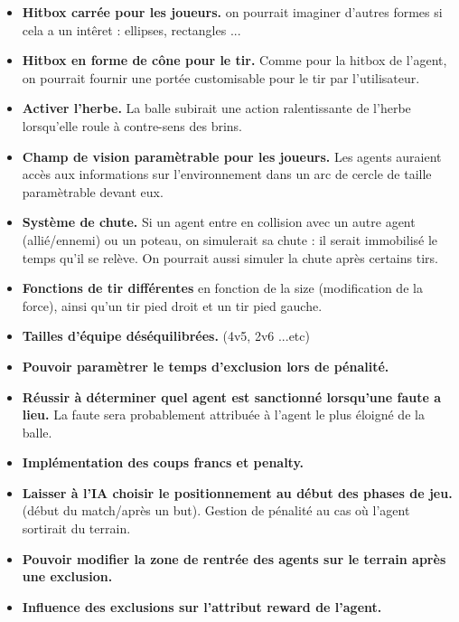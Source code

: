 \documentclass[11pt, a4paper]{article}
\begin{document}
	\begin{itemize}
		\item \textbf{Hitbox carrée pour les joueurs.} on pourrait imaginer d'autres formes si cela a un intêret : ellipses, rectangles ...\\
		\item \textbf{Hitbox en forme de cône pour le tir.} Comme pour la hitbox de l'agent, on pourrait fournir une portée customisable pour le tir  par l'utilisateur.\\
		\item \textbf{Activer l'herbe.} La balle subirait une action ralentissante de l'herbe lorsqu'elle roule à contre-sens des brins.\\
		\item \textbf{Champ de vision paramètrable pour les joueurs.} Les agents auraient accès aux informations sur l'environnement dans un arc de cercle de taille paramètrable devant eux.\\
		\item \textbf{Système de chute.} Si un agent entre en collision avec un autre agent (allié/ennemi) ou un poteau, on simulerait sa chute : il serait immobilisé le temps qu'il se relève. On pourrait aussi simuler la chute après certains tirs.\\
		\item \textbf{Fonctions de tir différentes} en fonction de la size (modification de la force), ainsi qu'un tir pied droit et un tir pied gauche.\\
		\item \textbf{Tailles d'équipe déséquilibrées.} (4v5, 2v6 ...etc)\\
		\item \textbf{Pouvoir paramètrer le temps d'exclusion lors de pénalité.}\\
		\item \textbf{Réussir à déterminer quel agent est sanctionné lorsqu'une faute a lieu.} La faute sera probablement attribuée à l'agent le plus éloigné de la balle.\\
		\item \textbf{Implémentation des coups francs et penalty.} \\
		\item \textbf{Laisser à l'IA choisir le positionnement au début des phases de jeu.} (début du match/après un but). Gestion de pénalité au cas où l'agent sortirait du terrain.\\
		\item \textbf{Pouvoir modifier la zone de rentrée des agents sur le terrain après une exclusion.}\\
		\item \textbf{Influence des exclusions sur l'attribut reward de l'agent.}
		
\end{itemize}
		
\end{document}

